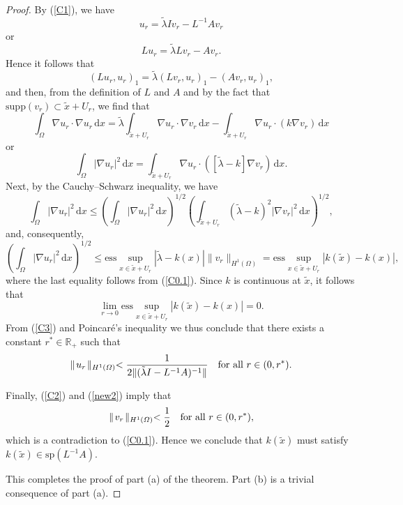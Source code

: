 \documentclass{imanum}
\begin{document}
\begin{proof}
By (\ref{C1}), we have
\begin{equation*}
u_r = \tilde \lambda I v_r - L^{-1} A v_r
\end{equation*}
or
\begin{equation*}
L u_r = \tilde \lambda L v_r - A v_r .
\end{equation*}
Hence it follows that
\begin{equation*}
(L u_r,u_r)_1 = \tilde \lambda (L v_r,u_r)_1 - (A v_r,u_r)_1 ,
\end{equation*}
and then, from the definition of $L$ and $A$ and
by the fact that $\mathrm{supp} (v_r) \subset \tilde x + U_r$,
we find that
\begin{equation*}
\int_{\Omega} \nabla u_r \cdot \nabla u_r \, \mathrm{d}x =
\tilde \lambda \int_{\tilde x + U_r} \nabla u_r \cdot
\nabla v_r \, \mathrm{d}x -
\int_{\tilde x + U_r} \nabla u_r \cdot (k \nabla v_r) \, \mathrm{d}x
\end{equation*}
or
\begin{equation*}
\int_{\Omega} |\nabla u_{r}|^2 \, \mathrm{d}x =
\int_{\tilde x + U_r} \nabla u_r \cdot ([\tilde \lambda-k]
\nabla v_r) \, \mathrm{d}x .
\end{equation*}
Next, by the Cauchy--Schwarz inequality, we have
\begin{equation*}
\int_{\Omega} |\nabla u_{r}|^{2} \, \mathrm{d}x \leq
\left(\int_{\Omega} |\nabla u_{r}|^{2} \, \mathrm{d}x \right)^{1/2}
\left(\int_{\tilde x + U_r} (\tilde \lambda-k)^{2}
|\nabla v_{r}|^2 \, \mathrm{d}x \right)^{1/2} ,
\end{equation*}
and, consequently,
\begin{equation}
\left( \int_{\Omega} |\nabla u_r|^{2} \,
\mathrm{d}x \right)^{1/2} \leq
\mathrm{ess} \sup_{x \in \tilde x + U_r} |\tilde \lambda - k(x)|
\parallel\! v_r \!\parallel_{H^1(\Omega)}
= \mathrm{ess} \sup_{x \in \tilde x + U_r} |k(\tilde x) - k(x)| ,
\label{C3}
\end{equation}
where the last equality follows from (\ref{C0.1}).
Since $k$ is continuous at $\tilde x$, it follows that
\begin{equation*}
\lim_{r \rightarrow 0} \mathrm{ess}
\sup_{x \in \tilde x + U_r} |k(\tilde x) - k(x)| = 0.
\end{equation*}
From (\ref{C3}) and Poincar\'e's inequality we thus conclude that
there exists a constant $r^\ast \in \mathbb{R}_+$ such that
\begin{equation}
\parallel\! u_r \!\parallel_{H^1(\Omega)} <
\frac{1}{2 \| (\tilde \lambda I-L^{-1}A)^{-1} \|}
\quad \hbox{for all}\ r \in (0,r^\ast).
\label{new2}
\end{equation}

Finally, (\ref{C2}) and (\ref{new2}) imply that
\begin{equation*}
\parallel\! v_r \!\parallel_{H^1(\Omega)} < \frac{1}{2}
\quad \hbox{for all}\ r \in (0,r^\ast),
\end{equation*}
which is a contradiction to (\ref{C0.1}). Hence we conclude that
$k(\tilde x)$ must satisfy $k(\tilde x) \in \mathrm{sp}(L^{-1}A)$.

This completes the proof of part (a) of the theorem. Part (b) is a
trivial consequence of part (a).
\end{proof}
\end{document}
